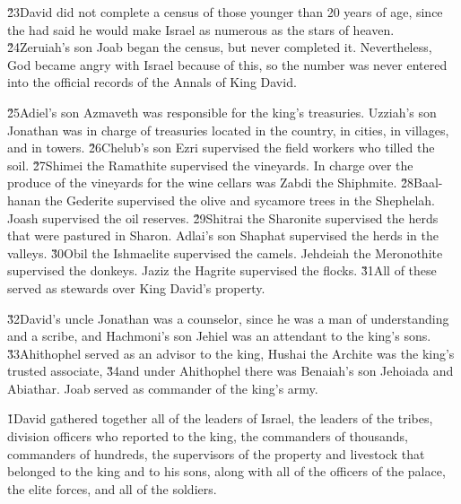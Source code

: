 \v{23}David did not complete a census of those younger than 20 years of age, since the  had said he would make Israel as numerous as the stars of heaven. \v{24}Zeruiah's son Joab began the census, but never completed it. Nevertheless, God became angry with Israel because of this, so the number was never entered into the official records of the Annals of King David.

\v{25}Adiel's son Azmaveth was responsible for the king's treasuries. Uzziah's son Jonathan was in charge of treasuries located in the country, in cities, in villages, and in towers. \v{26}Chelub's son Ezri supervised the field workers who tilled the soil. \v{27}Shimei the Ramathite supervised the vineyards. In charge over the produce of the vineyards for the wine cellars was Zabdi the Shiphmite. \v{28}Baal-hanan the Gederite supervised the olive and sycamore trees in the Shephelah. Joash supervised the oil reserves. \v{29}Shitrai the Sharonite supervised the herds that were pastured in Sharon. Adlai's son Shaphat supervised the herds in the valleys. \v{30}Obil the Ishmaelite supervised the camels. Jehdeiah the Meronothite supervised the donkeys. Jaziz the Hagrite supervised the flocks. \v{31}All of these served as stewards over King David's property.

\v{32}David's uncle Jonathan was a counselor, since he was a man of understanding and a scribe, and Hachmoni's son Jehiel was an attendant to the king's sons. \v{33}Ahithophel served as an advisor to the king, Hushai the Archite was the king's trusted associate, \v{34}and under Ahithophel there was Benaiah's son Jehoiada and Abiathar. Joab served as commander of the king's army.

\v{1}David gathered together all of the leaders of Israel, the leaders of the tribes, division officers who reported to the king, the commanders of thousands, commanders of hundreds, the supervisors of the property and livestock that belonged to the king and to his sons, along with all of the officers of the palace, the elite forces, and all of the soldiers.


